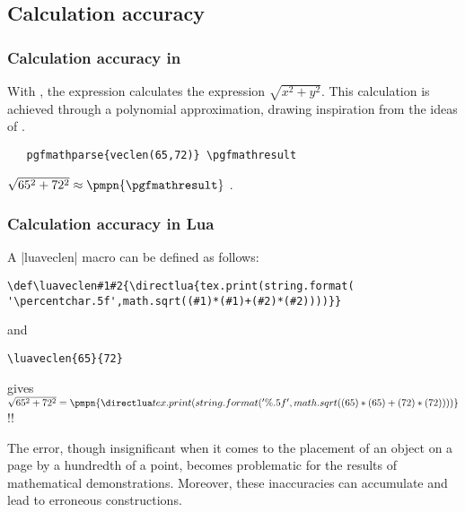 \subsection{Calculation accuracy} %
\label{sub:calculation_accuracy}

\subsubsection{Calculation accuracy in \TIKZ} %
\label{ssub:calculation_accuracy_in_tikz}

With \TIKZ,  the expression  calculates the expression $\sqrt{x^2+y^2}$.
This calculation is achieved through a polynomial approximation, drawing inspiration from the ideas  of .

  
\begin{mybox}{}
\begin{verbatim}
   pgfmathparse{veclen(65,72)} \pgfmathresult
\end{verbatim}
\end{mybox}

 \tkzHand $\sqrt{65^2+72^2} \approx \pmpn{\pgfmathresult} $ \tkzRBomb.

\subsubsection{Calculation accuracy in Lua} %
\label{ssub:calculation_accuracy_in_lua}

A |luaveclen| macro can be defined as follows:

\begin{mybox}{}
\begin{verbatim}
\def\luaveclen#1#2{\directlua{tex.print(string.format(
'\percentchar.5f',math.sqrt((#1)*(#1)+(#2)*(#2))))}}
\end{verbatim}
\end{mybox}

and

\begin{mybox}
\begin{verbatim}
\luaveclen{65}{72}
\end{verbatim}
\end{mybox}

gives 
\tkzHand $\sqrt{65^2+72^2} = \pmpn{\luaveclen{65}{72}} $ {\color{red}!!}

The error, though insignificant when it comes to the placement of an object on a page by a hundredth of a point, becomes problematic for the results of mathematical demonstrations. Moreover, these inaccuracies can accumulate and lead to erroneous constructions.

